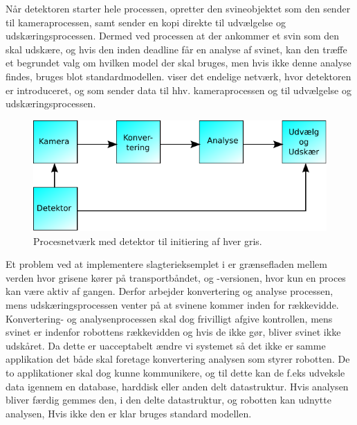 Når detektoren starter hele processen, opretter den svineobjektet som den sender til kameraprocessen, samt sender en kopi direkte til udvælgelse og udskæringsprocessen. Dermed ved processen at der ankommer et svin som den skal udskære, og hvis den inden deadline får en analyse af svinet, kan den træffe et begrundet valg om hvilken model der skal bruges,  men hvis ikke denne analyse findes, bruges blot standardmodellen.  viser det endelige  netværk, hvor detektoren er introduceret, og som sender data til hhv. kameraprocessen og til udvælgelse og udskæringsprocessen. 

\begin{figure}
 \begin{center}
  \includegraphics[scale=1]{images/pig-network2}
	\caption{Procesnetværk med detektor til initiering af hver gris.}
	\label{fig:pig-network2}
\end{center}
\end{figure}

Et problem ved at implementere  slagterieksemplet i \pycsp er  grænsefladen mellem verden hvor grisene kører på transportbåndet, og  -versionen,  hvor  kun en proces kan være aktiv af gangen. Derfor arbejder konvertering og analyse processen, mens  udskæringsprocessen venter på at svinene kommer inden for rækkevidde. Konvertering- og analysenprocessen  skal dog frivilligt afgive kontrollen, mens svinet er indenfor robottens rækkevidden og hvis de ikke gør, bliver svinet ikke udskåret. Da dette er uacceptabelt ændre vi systemet så det ikke er samme applikation det  både skal foretage konvertering analysen som  styrer robotten. De to applikationer skal dog kunne kommunikere, og til dette kan de f.eks udveksle data igennem en database, harddisk eller anden delt datastruktur. Hvis analysen bliver færdig gemmes den, i den delte datastruktur, og robotten kan udnytte analysen, Hvis ikke den er klar bruges standard modellen.    



